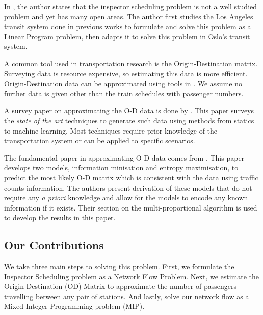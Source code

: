 \documentclass[11pt]{article}
\begin{document}
\par In \cite{mastersthesis}, the author states that the inspector scheduling problem is not a well studied problem and yet has many open areas. The author first studies the Los Angeles transit system done in previous works \cite{jiang_sandholm_2012}\cite{yin_sullivan_2012} to formulate and solve this problem as a Linear Program problem, then adapts it to solve this problem in Oslo's transit system.

\par A common tool used in transportation research is the Origin-Destination matrix. Surveying data is resource expensive, so estimating this data is more efficient. Origin-Destination data can be approximated using tools in \cite{caceres_romero_benitez_2011}. We  assume no further data is given other than the train schedules with passenger numbers.
\par A survey paper on approximating the O-D data is done by \cite{bera_krishna_rao}. This paper surveys the \textit{state of the art} techniques to generate such data using methods from statics to machine learning. Most techniques require prior knowledge of the transportation system or can be applied to specific scenarios.
\par The fundamental paper in approximating O-D data comes from \cite{van_zuylen_willumsen_2002}. This paper develops two models, information minisation and entropy maximisation, to predict the most likely O-D matrix which is consistent with the data using traffic counts information. The authors present derivation of these models that do not require any \textit{a priori} knowledge and allow for the models to encode any known information if it exists. Their section on the multi-proportional algorithm is used to develop the results in this paper.

\subsection{Our Contributions}

\par We take three main steps to solving this problem. First, we formulate the Inspector Scheduling problem as a Network Flow Problem. Next, we estimate the Origin-Destination (OD) Matrix to approximate the number of passengers travelling between any pair of stations. And lastly, solve our network flow as a Mixed Integer Programming problem (MIP).
\end{document}
